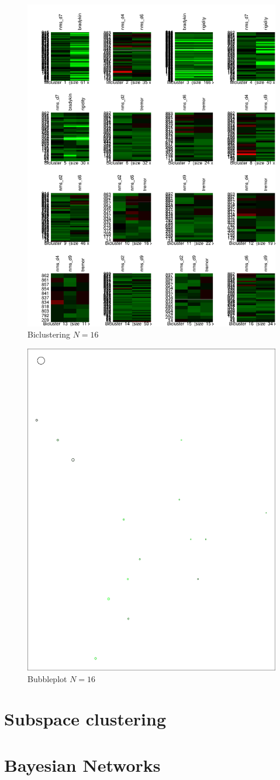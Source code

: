 \documentclass[letterpaper,12pt]{article}
\begin{document}
\begin{figure}[ht]
  \centering
  \includegraphics[width=0.8\linewidth]{biclust-16.pdf}
  \caption{Biclustering $N = 16$}
  \label{fig:biclust-16}
\end{figure}

\begin{figure}[ht]
  \centering
  \includegraphics[width=0.8\linewidth]{bubbleplot-16.pdf}
  \caption{Bubbleplot $N = 16$}
  \label{fig:bubbleplot-16}
\end{figure}

\section{Subspace clustering}


\section{Bayesian Networks}
\end{document}
